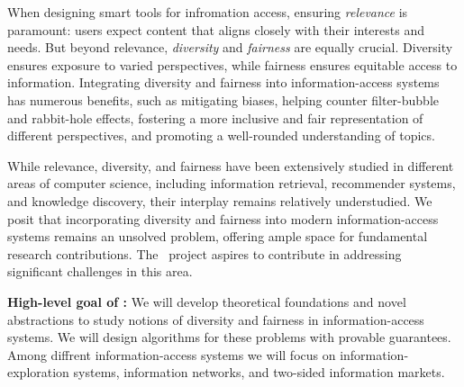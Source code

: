 \documentclass[a4paper,11pt]{article}
\begin{document}

When designing smart tools for infromation access, ensuring \emph{relevance} is paramount:
users expect content that aligns closely with their interests and needs.
But beyond relevance, \emph{diversity} and \emph{fairness} are equally crucial.
Diversity ensures exposure to varied perspectives, 
while fairness ensures equitable access to information.
Integrating diversity and fairness into information-access systems has numerous benefits, 
such as mitigating biases, 
helping counter filter-bubble and rabbit-hole effects, 
fostering a more inclusive and fair representation of different perspectives, and 
promoting a well-rounded understanding of topics.

While relevance, diversity, and fairness
have been extensively studied in different areas of computer science, 
including information retrieval, recommender systems, and knowledge discovery,
their interplay remains relatively understudied.
We posit that incorporating diversity and fairness into modern information-access systems
remains an unsolved problem, 
offering ample space for fundamental research contributions.
The \acronym\ project aspires to contribute in addressing 
significant challenges in this area. 

\medskip
\noindent
\hspace{-3mm}\colorbox{verylightmagenta}{
\begin{minipage}{\textwidth}
{\bf High-level goal of \acronym:} 
We will develop theoretical foundations and novel abstractions to 
study notions of diversity and fairness in information-access systems.
We will design algorithms for these problems with provable guarantees.
Among diffrent information-access systems we will focus on 
information-exploration systems, information networks, and two-sided information markets.
\end{minipage}}


\iffalse
\medskip
\noindent
\hspace{-3mm}\colorbox{verylightmagenta}{
\begin{minipage}{\textwidth}
{\bf Hypothesis:} 
We postulate that modern information-access systems suffer from lack of diversity 
and unfair representation of content. 
We hypothesize that such deficiencies can be mitigated by formulating novel abstractions
and designing rigorous computational methods to support individuals in 
maximizing diversity and improving fairness of the available content. 
\end{minipage}}
\fi
\end{document}
